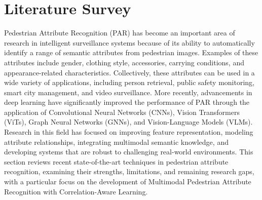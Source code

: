 \documentclass{ieeeaccess}
\begin{document}
\section{Literature Survey}\label{sec3}
Pedestrian Attribute Recognition (PAR) has become an important area of research in intelligent surveillance systems because of its ability to automatically identify a range of semantic attributes from pedestrian images. Examples of these attributes include gender, clothing style, accessories, carrying conditions, and appearance-related characteristics. Collectively, these attributes can be used in a wide variety of applications, including person retrieval, public safety monitoring, smart city management, and video surveillance. More recently, advancements in deep learning have significantly improved the performance of PAR through the application of Convolutional Neural Networks (CNNs), Vision Transformers (ViTs), Graph Neural Networks (GNNs), and Vision-Language Models (VLMs). Research in this field has focused on improving feature representation, modeling attribute relationships, integrating multimodal semantic knowledge, and developing systems that are robust to challenging real-world environments. This section reviews recent state-of-the-art techniques in pedestrian attribute recognition, examining their strengths, limitations, and remaining research gaps, with a particular focus on the development of Multimodal Pedestrian Attribute Recognition with Correlation-Aware Learning.
\end{document}

